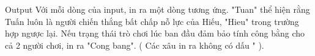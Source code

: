 Output
Với mỗi dòng của input, in ra một dòng tương ứng. "Tuan" thể hiện rằng Tuấn luôn là người chiến thắng bất chấp nỗ lực của Hiếu, "Hieu" trong trường hợp ngược lại. Nếu trạng thái trò chơi lúc ban đầu đảm bảo tính công bằng cho cả 2 người chơi, in ra "Cong bang". ( Các xâu in ra không có dấu " ).